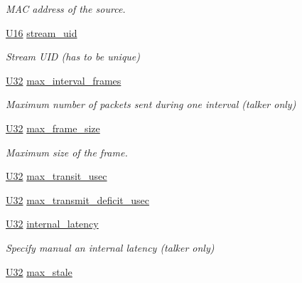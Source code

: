 \begin{DoxyCompactItemize}
\begin{DoxyCompactList}\small\item\em M\+AC address of the source. \end{DoxyCompactList}\item 
\hyperlink{openavb__types__base__pub_8h_a0a0a322d5fa4a546d293a77ba8b4a71f}{U16} \hyperlink{structopenavb__tl__cfg__t_a511b2a26fe61b945ced1dd0bab9f2d1b}{stream\+\_\+uid}
\begin{DoxyCompactList}\small\item\em Stream U\+ID (has to be unique) \end{DoxyCompactList}\item 
\hyperlink{openavb__types__base__pub_8h_a696390429f2f3b644bde8d0322a24124}{U32} \hyperlink{structopenavb__tl__cfg__t_abf63c5094d06b48eb2da41a9cf3e1d00}{max\+\_\+interval\+\_\+frames}
\begin{DoxyCompactList}\small\item\em Maximum number of packets sent during one interval (talker only) \end{DoxyCompactList}\item 
\hyperlink{openavb__types__base__pub_8h_a696390429f2f3b644bde8d0322a24124}{U32} \hyperlink{structopenavb__tl__cfg__t_ac2af862bb15aba31178c61c260f5c54b}{max\+\_\+frame\+\_\+size}
\begin{DoxyCompactList}\small\item\em Maximum size of the frame. \end{DoxyCompactList}\item 
\hyperlink{openavb__types__base__pub_8h_a696390429f2f3b644bde8d0322a24124}{U32} \hyperlink{structopenavb__tl__cfg__t_a0980bddad549fb206164677f8095d44b}{max\+\_\+transit\+\_\+usec}
\item 
\hyperlink{openavb__types__base__pub_8h_a696390429f2f3b644bde8d0322a24124}{U32} \hyperlink{structopenavb__tl__cfg__t_adca8d3921ed9e2b689df1e37ffaf1a3d}{max\+\_\+transmit\+\_\+deficit\+\_\+usec}
\item 
\hyperlink{openavb__types__base__pub_8h_a696390429f2f3b644bde8d0322a24124}{U32} \hyperlink{structopenavb__tl__cfg__t_a770b9a7e3ef496ca3269c2005f12fa81}{internal\+\_\+latency}
\begin{DoxyCompactList}\small\item\em Specify manual an internal latency (talker only) \end{DoxyCompactList}\item 
\hyperlink{openavb__types__base__pub_8h_a696390429f2f3b644bde8d0322a24124}{U32} \hyperlink{structopenavb__tl__cfg__t_aea5235cb82456b3c3285f5f6910dd4dc}{max\+\_\+stale}

\end{DoxyCompactItemize}
